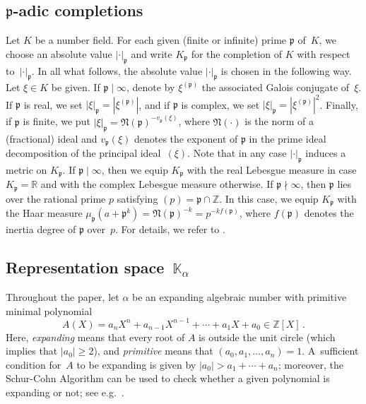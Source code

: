 \documentclass[12pt]{amsart}
\theoremstyle{definition}
\theoremstyle{remark}
\numberwithin{equation}{section}
\begin{document}
\subsection*{$\mathfrak{p}$-adic completions}
Let $K$ be a number field. For each given (finite or infinite) prime $\mathfrak{p}$ of~$K$, we choose an absolute value $\lvert\cdot\rvert_\mathfrak{p}$ and write $K_\mathfrak{p}$ for the completion of $K$ with respect to~$\lvert\cdot\rvert_\mathfrak{p}$. In all what follows, the absolute value $\lvert\cdot\rvert_\mathfrak{p}$ is chosen in the following way. Let $\xi \in K$ be given. If $\mathfrak{p} \mid \infty$, denote by $\xi^{(\mathfrak{p})}$ the associated Galois conjugate of~$\xi$. If $\mathfrak{p}$ is real, we set $|\xi|_\mathfrak{p} = |\xi^{(\mathfrak{p})}|$, and if $\mathfrak{p}$ is complex, we set $|\xi|_\mathfrak{p} = |\xi^{(\mathfrak{p})}|^2$.
Finally, if $\mathfrak{p}$ is finite, we put $|\xi|_\mathfrak{p}=\mathfrak{N}(\mathfrak{p})^{-v_\mathfrak{p}(\xi)}$, where $\mathfrak{N}(\cdot)$ is the norm of a (fractional) ideal and $v_\mathfrak{p}(\xi)$ denotes the exponent of $\mathfrak{p}$ in the prime ideal decomposition of the principal ideal~$(\xi)$. Note that in any case $\lvert\cdot\rvert_\mathfrak{p}$ induces a metric on $K_\mathfrak{p}$. If $\mathfrak{p} \mid \infty$, then we equip $K_\mathfrak{p}$ with the real Lebesgue measure in case $K_\mathfrak{p} = \mathbb{R}$ and with the complex Lebesgue measure otherwise.
If $\mathfrak{p} \nmid \infty$, then $\mathfrak{p}$ lies over the rational prime $p$ satisfying $(p) = \mathfrak{p} \cap \mathbb{Z}$.
In this case, we equip $K_\mathfrak{p}$ with the Haar measure $\mu_\mathfrak{p}(a + \mathfrak{p}^k) = \mathfrak{N}(\mathfrak{p})^{-k}= p^{-k f(\mathfrak{p})}$, where $f(\mathfrak{p})$ denotes the inertia degree of $\mathfrak{p}$ over~$p$.
For details, we refer to \cite[Chapter~I, \S8, and Chapter~III, \S1]{Neukirch:99}.

\subsection*{Representation space~$\mathbb{K}_\alpha$}
Throughout the paper, let $\alpha$ be an expanding algebraic number with primitive minimal polynomial 
\begin{equation}\label{minpol}
A(X) = a_n X^n + a_{n-1} X^{n-1} + \cdots + a_1 X + a_0 \in \mathbb{Z}[X]\,.
\end{equation}
Here, \emph{expanding} means that every root of $A$ is outside the unit circle (which implies that $|a_0| \ge 2$), and \emph{primitive} means that $(a_0, a_1, \ldots, a_n) = 1$.
A~sufficient condition for~$A$ to be expanding is given by $|a_0| > a_1+\cdots + a_n$; moreover, the Schur-Cohn Algorithm can be used to check whether a given polynomial is expanding or not; see e.g.\ \cite[pp.~491--494]{Henrici:88}.
\end{document}
